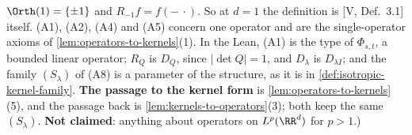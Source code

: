 \begin{definition}
{$\Orth(1) = \{\pm1\}$ and $R_{-1}f = f(-\,\cdot)$. So at $d = 1$ the definition is [V, Def.~3.1]
itself. (A1), (A2), (A4) and (A5) concern one operator and are the single-operator axioms of
\ref{lem:operators-to-kernels}(1). In the Lean, (A1) is the type of $\Phi_{s,t}$, a bounded
linear operator; $R_Q$ is $D_Q$, since $|\det Q| = 1$, and $D_\lambda$ is $D_{\lambda I}$; and the
family $(S_\lambda)$ of (A8) is a parameter of the structure, as it is in
\ref{def:isotropic-kernel-family}. \textbf{The passage to the kernel form} is
\ref{lem:operators-to-kernels}(5), and the passage back is \ref{lem:kernels-to-operators}(3); both
keep the same $(S_\lambda)$. \textbf{Not claimed}: anything about operators on $L^p(\RR^d)$ for
$p > 1$.)}
\end{definition}

